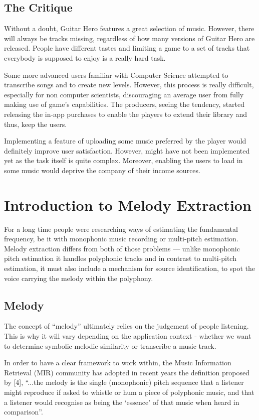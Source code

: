 \subsection{The Critique}

Without a doubt, Guitar Hero features a great selection of music. However, there will always be tracks missing, regardless of how many versions of Guitar Hero are released. People have different tastes and limiting a game to a set of tracks that everybody is supposed to enjoy is a really hard task. 

Some more advanced users familiar with Computer Science attempted to transcribe songs and to create new levels. However, this process is really difficult, especially for non computer scientists, discouraging an average user from fully making use of game’s capabilities. The producers, seeing the tendency, started releasing the in-app purchases to enable the players to extend their library and thus, keep the users. 

Implementing a feature of uploading some music preferred by the player would definitely improve user satisfaction. However, might have not been implemented yet as the task itself is quite complex. Moreover, enabling the users to load in some music would deprive the company of their income sources.


\section{Introduction to Melody Extraction}

For a long time people were researching ways of estimating the fundamental frequency, be it with monophonic music recording or multi-pitch estimation. Melody extraction differs from both of those problems — unlike monophonic pitch estimation it handles polyphonic tracks and in contrast to multi-pitch estimation, it must also include a mechanism for source identification, to spot the voice carrying the melody within the polyphony.


\subsection{Melody}

The concept of “melody” ultimately relies on the judgement of people listening. This is why it will vary depending on the application context - whether we want to determine symbolic melodic similarity or transcribe a music track. 

In order to have a clear framework to work within, the Music Information Retrieval (MIR) community has adopted in recent years the definition proposed by [4], “...the melody is the single (monophonic) pitch sequence that a listener might reproduce if asked to whistle or hum a piece of polyphonic music, and that a listener would recognise as being the ‘essence’ of that music when heard in comparison”.

